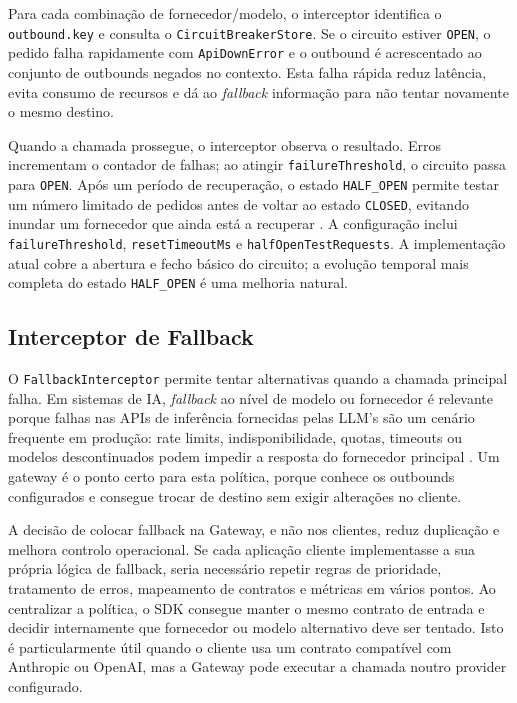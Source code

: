 \documentclass[11pt,a4paper]{report}
\begin{document}
    Para cada combinação de fornecedor/modelo, o interceptor identifica o \texttt{outbound.key} e consulta o \texttt{CircuitBreakerStore}. Se o circuito estiver \texttt{OPEN}, o pedido falha rapidamente com \texttt{ApiDownError} e o outbound é acrescentado ao conjunto de outbounds negados no contexto. Esta falha rápida reduz latência, evita consumo de recursos e dá ao \textit{fallback} informação para não tentar novamente o mesmo destino.

    Quando a chamada prossegue, o interceptor observa o resultado. Erros incrementam o contador de falhas; ao atingir \texttt{failureThreshold}, o circuito passa para \texttt{OPEN}. Após um período de recuperação, o estado \texttt{HALF\_OPEN} permite testar um número limitado de pedidos antes de voltar ao estado \texttt{CLOSED}, evitando inundar um fornecedor que ainda está a recuperar \cite{microsoft_circuit_breaker}. A configuração inclui \texttt{failureThreshold}, \texttt{resetTimeoutMs} e \texttt{halfOpenTestRequests}. A implementação atual cobre a abertura e fecho básico do circuito; a evolução temporal mais completa do estado \texttt{HALF\_OPEN} é uma melhoria natural.

    \subsection{Interceptor de Fallback}
    O \texttt{FallbackInterceptor} permite tentar alternativas quando a chamada principal falha. Em sistemas de IA, \textit{fallback} ao nível de modelo ou fornecedor é relevante porque falhas nas APIs de inferência fornecidas pelas LLM's são um cenário frequente em produção: rate limits, indisponibilidade, quotas, timeouts ou modelos descontinuados podem impedir a resposta do fornecedor principal \cite{ai_fallback_tombas,portkey_fallback}. Um gateway é o ponto certo para esta política, porque conhece os outbounds configurados e consegue trocar de destino sem exigir alterações no cliente.

    A decisão de colocar fallback na Gateway, e não nos clientes, reduz duplicação e melhora controlo operacional. Se cada aplicação cliente implementasse a sua própria lógica de fallback, seria necessário repetir regras de prioridade, tratamento de erros, mapeamento de contratos e métricas em vários pontos. Ao centralizar a política, o SDK consegue manter o mesmo contrato de entrada e decidir internamente que fornecedor ou modelo alternativo deve ser tentado. Isto é particularmente útil quando o cliente usa um contrato compatível com Anthropic ou OpenAI, mas a Gateway pode executar a chamada noutro provider configurado.
\end{document}
